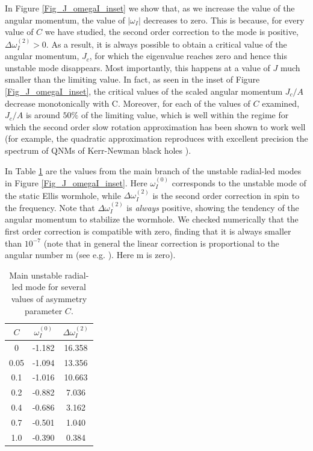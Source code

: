 \documentclass{article}
\begin{document}
In Figure \ref{Fig_J_omegaI_inset} we show that, as we increase the value of the angular momentum, the value of $|\omega_I|$ decreases to zero. This is because, for every value of $C$ we have studied, the second order correction to the mode is positive, $\Delta\omega_I^{(2)}>0$. 
%
As a result, it is always possible to obtain a critical value of the angular momentum, $J_c$, for which the %
{eigenvalue reaches zero} %
and hence {this unstable mode}
%
%
disappears. 
Most importantly, {this happens}
%
at a {value of $J$} much smaller %
{than the} limiting value.
%
{In fact,} as seen in the inset of Figure \ref{Fig_J_omegaI_inset}, the 
critical values of the scaled angular momentum {$J_c/A$ decrease monotonically with C.}
{Moreover,} for each of the values of $C$ examined, 
%
{$J_c/A$} is around $50\%$ of the limiting value, which is well within the regime for which the second order slow rotation approximation has been shown to work {well} (for example, the quadratic approximation reproduces with excellent precision the spectrum of QNMs of Kerr-Newman black holes \cite{Blazquez-Salcedo:2022eik}).
%
{
In Table \ref{ImOm_coeff_main} are the values from the main branch of the unstable radial-led modes in Figure \ref{Fig_J_omegaI_inset}. 
Here $\omega^{(0)}_I$ corresponds to the unstable mode of the static Ellis wormhole, while $\Delta\omega^{(2)}_I$ is the second order correction in spin to the frequency. 
Note that $\Delta\omega^{(2)}_I$ is \emph{always} positive, showing the tendency of the angular momentum to stabilize the wormhole. 
We checked numerically that the 
first order correction
is compatible with zero, finding that it is always smaller than $10^{-7}$
(note that in general the linear correction is proportional to the angular number $\mathrm{m}$ (see e.g. \cite{Blazquez-Salcedo:2022eik}). Here $\mathrm{m}$ is zero).

\begin{table}[h!]
\begin{center}
\begin{tabular}{ || c | c c || }
 \hline
$C$ & $\omega^{(0)}_I$ & $\Delta\omega^{(2)}_I$ 
\\ 
  \hline
0 & -1.182 & 16.358
  \\ 
   0.05 & -1.094 & 13.356
  \\ 
   0.1 & -1.016 & 10.663
  \\ 
  0.2 & -0.882 & 7.036
  \\ 
  0.4 & -0.686 & 3.162
  \\ 
  0.7 & -0.501 & 1.040
  \\ 
  1.0 & -0.390 & 0.384
  \\ 
  \hline
\end{tabular}
\end{center}
\caption{Main unstable radial-led mode for several values of asymmetry parameter $C$.}
\label{ImOm_coeff_main}
\end{table}
}
\end{document}
